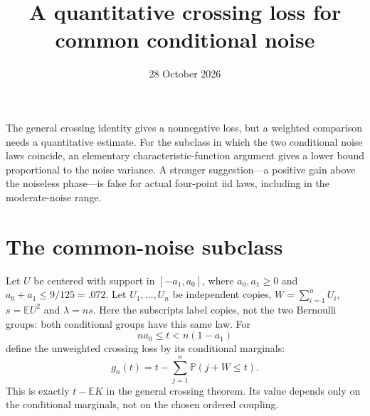 \documentclass[11pt,a4paper]{article}
\title{A quantitative crossing loss for common conditional noise}
\author{}\date{28 October 2026}
\newcommand{\E}{\mathbb E}\newcommand{\Pp}{\mathbb P}
\begin{document}
\maketitle

The general crossing identity gives a nonnegative loss, but a weighted
comparison needs a quantitative estimate. For the subclass in which the
two conditional noise laws coincide, an elementary characteristic-function
argument gives a lower bound proportional to the noise variance. A stronger
suggestion---a positive gain above the noiseless phase---is false for actual
four-point iid laws, including in the moderate-noise range.

\section{The common-noise subclass}
Let $U$ be centered with support in $[-a_1,a_0]$, where
$a_0,a_1\ge0$ and $a_0+a_1\le9/125=.072$. Let $U_1,\ldots,U_n$ be
independent copies, $W=\sum_{i=1}^nU_i$, $s=\E U^2$ and $\lambda=ns$.
Here the subscripts label copies, not the two Bernoulli groups: both
conditional groups have this same law.
For
\[
                 na_0\le t<n(1-a_1)
\]
define the unweighted crossing loss by its conditional marginals:
\[
 g_n(t)=t-\sum_{j=1}^n\Pp(j+W\le t).
\]
This is exactly $t-\E K$ in the general crossing theorem. Its value
depends only on the conditional marginals, not on the chosen ordered
coupling.
\end{document}
